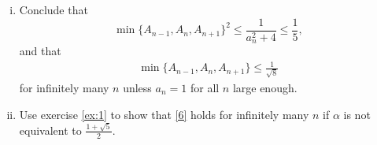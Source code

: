 \documentclass[12pt,a4paper]{article}
\theoremstyle{plain}
\theoremstyle{definition}
\begin{document}
{\begin{enumerate}[i)]
		\item Conclude that 
			\[ \min \{ A_{n-1}, A_n, A_{n+1} \}^2 \leq \frac{1}{a_n^2 + 4} \leq \frac15, \]
		and that
			\begin{gather}
				\min \{ A_{n-1}, A_n, A_{n+1} \} \leq \frac{1}{\sqrt{8}} \label{6}
			\end{gather}
		for infinitely many $n$ unless $a_n =1$ for all $n$ large enough.

		\item Use exercise \ref{ex:1} to show that \eqref{6} holds for infinitely many $n$ if $\alpha$ is not equivalent to $ \frac{1+\sqrt{5}}2$.
			
	\end{enumerate}
}
{}
\end{document}
